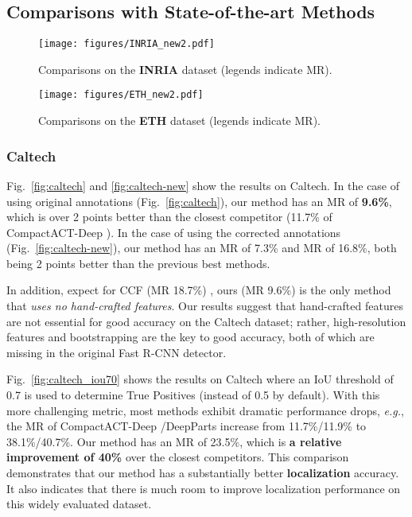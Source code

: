 \documentclass[runningheads]{llncs}
\def\eg{\emph{e.g.}}
\begin{document}
\subsection{Comparisons with State-of-the-art Methods}

\begin{figure}[t] \centering
\texttt{[image: figures/INRIA\_new2.pdf]}
\caption{Comparisons on the \textbf{INRIA} dataset (legends indicate MR).}
\label{fig:inria}
\texttt{[image: figures/ETH\_new2.pdf]}
\caption{Comparisons on the \textbf{ETH} dataset (legends indicate MR).}
\label{fig:eth}
\end{figure}



\subsubsection{Caltech} Fig.~\ref{fig:caltech} and  \ref{fig:caltech-new} show the results on Caltech. In the case of using original annotations (Fig.~\ref{fig:caltech}), our method has an MR of \textbf{9.6\%}, which is over 2 points better than the closest competitor (11.7\% of CompactACT-Deep \cite{cai2015learning}). In the case of using the corrected annotations (Fig.~\ref{fig:caltech-new}), our method has an MR of 7.3\% and MR of 16.8\%, both being 2 points better than the previous best methods.

In addition, expect for CCF (MR 18.7\%) \cite{yang2015convolutional}, ours (MR 9.6\%) is the only method  that \emph{uses no hand-crafted features}. Our results suggest that hand-crafted features are not essential for good accuracy on the Caltech dataset; rather, high-resolution features and bootstrapping are the key to good accuracy, both of which are missing in the original Fast R-CNN detector.

Fig.~\ref{fig:caltech_iou70} shows the results on Caltech where an IoU threshold of 0.7 is used to determine True Positives (instead of 0.5 by default). With this more challenging metric, most methods exhibit dramatic performance drops, \eg, the MR of CompactACT-Deep \cite{cai2015learning}/DeepParts \cite{tian2015deep} increase from 11.7\%/11.9\% to 38.1\%/40.7\%. Our method has an MR of 23.5\%, which is \textbf{a relative improvement of 40\%} over the closest competitors. This comparison demonstrates that our method has a substantially better \textbf{localization} accuracy. It also indicates that there is much room to improve localization performance on this widely evaluated dataset.
\end{document}
